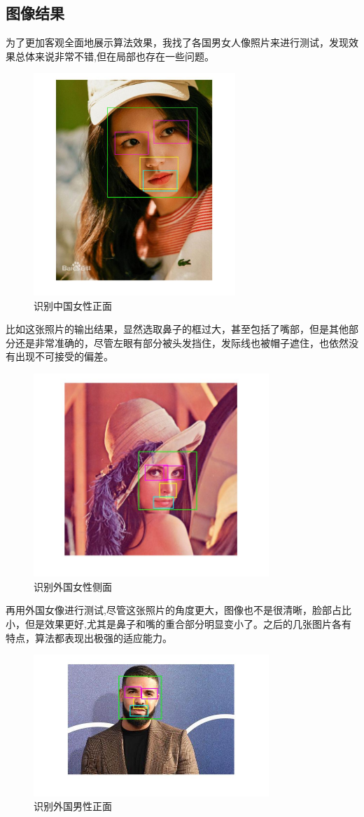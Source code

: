 \documentclass[a4paper, 14pt, twocolumn]{article}
\theoremstyle{definition}
\begin{document}
\subsection{图像结果}
为了更加客观全面地展示算法效果，我找了各国男女人像照片来进行测试，发现效果总体来说非常不错,但在局部也存在一些问题。
\begin{figure}[H]
\includegraphics[width=3in]{DetectFaceParts/figure/recog1.jpg}
\caption{识别中国女性正面}
\end{figure}
比如这张照片的输出结果，显然选取鼻子的框过大，甚至包括了嘴部，但是其他部分还是非常准确的，尽管左眼有部分被头发挡住，发际线也被帽子遮住，也依然没有出现不可接受的偏差。

\begin{figure}[H]
\includegraphics[width=3.5in]{DetectFaceParts/figure/recog2.jpg}
\caption{识别外国女性侧面}
\end{figure}
再用外国女像进行测试,尽管这张照片的角度更大，图像也不是很清晰，脸部占比小，但是效果更好,尤其是鼻子和嘴的重合部分明显变小了。之后的几张图片各有特点，算法都表现出极强的适应能力。
\begin{figure}[H]
\includegraphics[width=3.5in]{DetectFaceParts/figure/recog4.jpg}
\caption{识别外国男性正面}
\end{figure}
\end{document}
